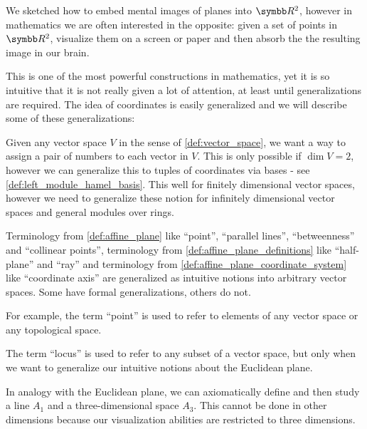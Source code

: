 \begin{remark}\label{remark:coordinate_systems}
  We sketched how to embed mental images of planes into \( \R^2 \), however in mathematics we are often interested in the opposite: given a set of points in \( \R^2 \), visualize them on a screen or paper and then absorb the the resulting image in our brain.

  This is one of the most powerful constructions in mathematics, yet it is so intuitive that it is not really given a lot of attention, at least until generalizations are required. The idea of coordinates is easily generalized and we will describe some of these generalizations:
  \begin{remenum}
     Given any vector space \( V \) in the sense of \cref{def:vector_space}, we want a way to assign a pair of numbers to each vector in \( V \). This is only possible if \( \dim V = 2 \), however we can generalize this to tuples of coordinates via bases - see \cref{def:left_module_hamel_basis}. This well for finitely dimensional vector spaces, however we need to generalize these notion for infinitely dimensional vector spaces and general modules over rings.

     Terminology from \cref{def:affine_plane} like \enquote{point}, \enquote{parallel lines}, \enquote{betweenness} and \enquote{collinear points}, terminology from \cref{def:affine_plane_definitions} like \enquote{half-plane} and \enquote{ray} and terminology from \cref{def:affine_plane_coordinate_system} like \enquote{coordinate axis} are generalized as intuitive notions into arbitrary vector spaces. Some have formal generalizations, others do not.

    For example, the term \enquote{point} is used to refer to elements of any vector space or any topological space.

     The term \enquote{locus} is used to refer to any subset of a vector space, but only when we want to generalize our intuitive notions about the Euclidean plane.

     In analogy with the Euclidean plane, we can axiomatically define and then study a line \( A_1 \) and a three-dimensional space \( A_3 \). This cannot be done in other dimensions because our visualization abilities are restricted to three dimensions.


\end{remenum}
\end{remark}
